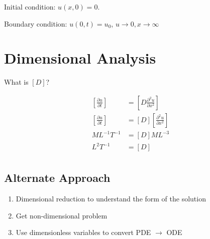 \documentclass[
	date={September 4{,} 2024}
]{math486notes}
\begin{document}
Initial condition: $u(x,0) = 0$.

Boundary condition: $u(0, t) = u_{0}$, $u\rightarrow0, x\rightarrow\infty$

\section{Dimensional Analysis}\label{sec:dimensional-analysis}
What is $[D]$?

\begin{equation*}
\begin{aligned}
	\left[ \frac{\partial u}{\partial t} \right] &= \left[ D\frac{\partial^{2}u}{\partial x^{2}} \right]\\
	\left[ \frac{\partial u}{\partial t} \right] &= [D]\left[ \frac{\partial^{2}u}{\partial x^{2}} \right]\\
	ML^{-1}T^{-1} &= [D]ML^{-3}\\
	L^{2}T^{-1} &= [D]\\
\end{aligned}
\end{equation*}

\subsection{Alternate Approach}\label{subsec:alternate-approach}
\begin{enumerate}
	\item Dimensional reduction to understand the form of the solution
	\item Get non-dimensional problem
	\item Use dimensionless variables to convert PDE $\rightarrow$ ODE
\end{enumerate}
\end{document}
